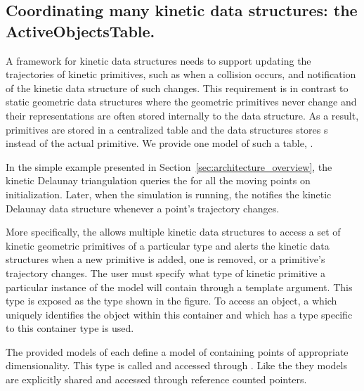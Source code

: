 \subsection{Coordinating many kinetic data structures: the ActiveObjectsTable.}
\label{sec:moving_object_table}

A framework for kinetic data structures needs to support updating the
trajectories of kinetic primitives, such as when a collision occurs,
and notification of the kinetic data structure of such changes. This
requirement is in contrast to static geometric data structures where
the geometric primitives never change and their representations are
often stored internally to the data structure. As a result, primitives
are stored in a centralized table and the data structures stores
s instead of the actual primitive. We provide one model of
such a table, .

In the simple example presented in
Section~\ref{sec:architecture_overview}, the kinetic Delaunay
triangulation queries the  for all the moving points on
initialization. Later, when the simulation is running, the
 notifies the kinetic Delaunay data structure whenever a point's
trajectory changes.

More specifically, the  allows multiple kinetic
data structures to access a set of kinetic geometric primitives of a
particular type and alerts the kinetic data structures when a new
primitive is added, one is removed, or a primitive's trajectory
changes. The user must specify what type of kinetic primitive a
particular instance of the  model will contain
through a template argument. This type is exposed as the 
type shown in the figure. To access an object, a  which
uniquely identifies the object within this container and which has a
type specific to this container type is used.

The provided models of  each define a model of
 containing points of appropriate
dimensionality. This type is called
 and accessed through
. Like the
 they  models are explicitly shared
and accessed through reference counted pointers.

